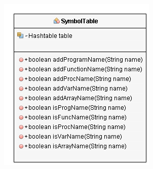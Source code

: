 \documentclass[10]{article}
\begin{document}
\begin{appendices}
\begin{figure}
	\includegraphics{SymTableUML.png}
\end{figure}

\end{appendices}
\end{document}
